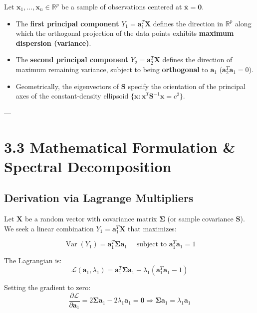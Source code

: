 \documentclass[
]{article}
\begin{document}
Let \(\mathbf{x}_{1},\ldots,\mathbf{x}_{n} \in \mathbb{R}^{p}\) be a
sample of observations centered at
\(\overline{\mathbf{x}} = \mathbf{0}\).

\begin{itemize}
\item
  The \textbf{first principal component}
  \(Y_{1} = \mathbf{a}_{1}^{T}\mathbf{X}\) defines the direction in
  \(\mathbb{R}^{p}\) along which the orthogonal projection of the data
  points exhibits \textbf{maximum dispersion (variance)}.
\item
  The \textbf{second principal component}
  \(Y_{2} = \mathbf{a}_{2}^{T}\mathbf{X}\) defines the direction of
  maximum remaining variance, subject to being \textbf{orthogonal} to
  \(\mathbf{a}_{1}\) (\(\mathbf{a}_{2}^{T}\mathbf{a}_{1} = 0\)).
\item
  Geometrically, the eigenvectors of \(\mathbf{S}\) specify the
  orientation of the principal axes of the constant-density ellipsoid
  \(\{\mathbf{x}:\mathbf{x}^{T}\mathbf{S}^{- 1}\mathbf{x} = c^{2}\}\).
\end{itemize}

---

\textbf{ }

\section{3.3 Mathematical Formulation \& Spectral Decomposition}

\textbf{ }

\subsection{Derivation via Lagrange Multipliers}

Let \(\mathbf{X}\) be a random vector with covariance matrix
\(\mathbf{\Sigma}\) (or sample covariance \(\mathbf{S}\)). We seek a
linear combination \(Y_{1} = \mathbf{a}_{1}^{T}\mathbf{X}\) that
maximizes:

\[\operatorname{Var}(Y_{1}) = \mathbf{a}_{1}^{T}\mathbf{\Sigma}\mathbf{a}_{1}\quad\text{ subject to  }\mathbf{a}_{1}^{T}\mathbf{a}_{1} = 1\]

The Lagrangian is:
\[\mathcal{L}(\mathbf{a}_{1},\lambda_{1}) = \mathbf{a}_{1}^{T}\mathbf{\Sigma}\mathbf{a}_{1} - \lambda_{1}\left( \mathbf{a}_{1}^{T}\mathbf{a}_{1} - 1 \right)\]

Setting the gradient to zero:
\[\frac{\partial\mathcal{L}}{\partial\mathbf{a}_{1}} = 2\mathbf{\Sigma}\mathbf{a}_{1} - 2\lambda_{1}\mathbf{a}_{1} = \mathbf{0} \Longrightarrow \mathbf{\Sigma}\mathbf{a}_{1} = \lambda_{1}\mathbf{a}_{1}\]
\end{document}
